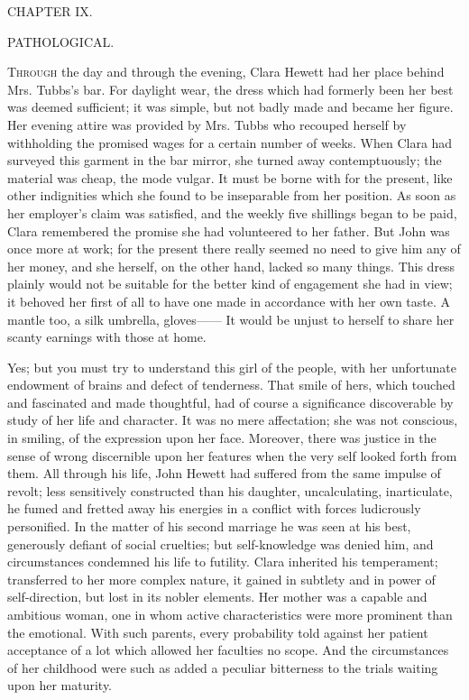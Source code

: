{}

{CHAPTER IX.}

PATHOLOGICAL.

\textsc{Through} the day and through the evening, Clara Hewett had her
place behind Mrs. Tubbs's bar. For daylight wear, the dress which had
formerly been her best was deemed sufficient; it was simple, but not
badly made and became her figure. Her evening attire was provided by
Mrs. Tubbs who recouped herself by withholding the promised wages for a
certain number of weeks. When Clara had surveyed this garment in the bar
mirror, she turned away contemptuously; the material was cheap, the mode
vulgar. It must be borne with for the present, like other indignities
which she found to be inseparable from her position. As soon as her
employer's claim was satisfied, and the weekly five shillings began to
be paid, Clara remembered {}the promise she had volunteered to her
father. But John was once more at work; for the present there really
seemed no need to give him any of her money, and she herself, on the
other hand, lacked so many things. This dress plainly would not be
suitable for the better kind of engagement she had in view; it behoved
her first of all to have one made in accordance with her own taste. A
mantle too, a silk umbrella, gloves{{------}} It would be unjust to
herself to share her scanty earnings with those at home.

Yes; but you must try to understand this girl of the people, with her
unfortunate endowment of brains and defect of tenderness. That smile of
hers, which touched and fascinated and made thoughtful, had of course a
significance discoverable by study of her life and character. It was no
mere affectation; she was not conscious, in smiling, of the expression
upon her face. Moreover, there was justice in the sense of wrong
discernible upon her features when the very self looked forth from them.
All through his life, John {}Hewett had suffered from the same impulse
of revolt; less sensitively constructed than his daughter,
uncalculating, inarticulate, he fumed and fretted away his energies in a
conflict with forces ludicrously personified. In the matter of his
second marriage he was seen at his best, generously defiant of social
cruelties; but self-knowledge was denied him, and circumstances
condemned his life to futility. Clara inherited his temperament;
transferred to her more complex nature, it gained in subtlety and in
power of self-direction, but lost in its nobler elements. Her mother was
a capable and ambitious woman, one in whom active characteristics were
more prominent than the emotional. With such parents, every probability
told against her patient acceptance of a lot which allowed her faculties
no scope. And the circumstances of her childhood were such as added a
peculiar bitterness to the trials waiting upon her maturity.

